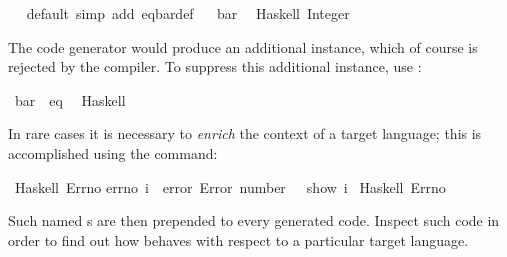 \begin{isabellebody}
\isanewline
{}\isamarkupfalse%
\ \isamarkupfalse%
\ default\ {\isacharparenleft}simp\ add{\isacharcolon}\ eq{\isacharunderscore}bar{\isacharunderscore}def{\isacharparenright}\isanewline
\isanewline
{}\isamarkupfalse%
%
\endisatagquote
{\isafoldquote}%
%
\isadelimquote
%
\endisadelimquote
%
\isadelimquotett
\ %
\endisadelimquotett
%
\isatagquotett
{}\isamarkupfalse%
\ bar\isanewline
\ \ {\isacharparenleft}Haskell\ {\isachardoublequoteopen}Integer{\isachardoublequoteclose}{\isacharparenright}%
\endisatagquotett
{\isafoldquotett}%
%
\isadelimquotett
%
\endisadelimquotett
%
\begin{isamarkuptext}%
\noindent The code generator would produce an additional instance,
  which of course is rejected by the  compiler.  To
  suppress this additional instance, use \hypertarget{command.code-instance}{\hyperlink{command.code-instance}{\mbox{}}}:%
\end{isamarkuptext}%
\isamarkuptrue%
%
\isadelimquotett
%
\endisadelimquotett
%
\isatagquotett
{}\isamarkupfalse%
\ bar\ {\isacharcolon}{\isacharcolon}\ eq\isanewline
\ \ {\isacharparenleft}Haskell\ {\isacharminus}{\isacharparenright}%
\endisatagquotett
{\isafoldquotett}%
%
\isadelimquotett
%
\endisadelimquotett
%
\isamarkuptrue%
%
\begin{isamarkuptext}%
In rare cases it is necessary to \emph{enrich} the context of a
  target language; this is accomplished using the \hypertarget{command.code-include}{\hyperlink{command.code-include}{\mbox{}}} command:%
\end{isamarkuptext}%
\isamarkuptrue%
%
\isadelimquotett
%
\endisadelimquotett
%
\isatagquotett
{}\isamarkupfalse%
\ Haskell\ {\isachardoublequoteopen}Errno{\isachardoublequoteclose}\isanewline
{\isacharverbatimopen}errno\ i\ {\isacharequal}\ error\ {\isacharparenleft}{\isachardoublequote}Error\ number{\isacharcolon}\ {\isachardoublequote}\ {\isacharplus}{\isacharplus}\ show\ i{\isacharparenright}{\isacharverbatimclose}\isanewline
\isanewline
{}\isamarkupfalse%
\ Haskell\ Errno%
\endisatagquotett
{\isafoldquotett}%
%
\isadelimquotett
%
\endisadelimquotett
%
\begin{isamarkuptext}%
\noindent Such named s are then prepended to every
  generated code.  Inspect such code in order to find out how
  \hyperlink{command.code-include}{\mbox{}} behaves with respect to a particular
  target language.%
\end{isamarkuptext}%
\isamarkuptrue%
%
\isadelimtheory
%
\endisadelimtheory
%
\isatagtheory
{}\isamarkupfalse%
%
\endisatagtheory
{\isafoldtheory}%
%
\isadelimtheory
%
\endisadelimtheory
\isanewline
\end{isabellebody}%
